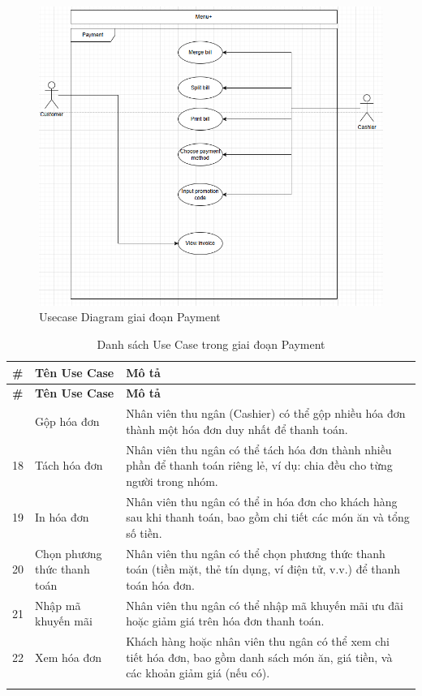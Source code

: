         \begin{figure}[H]
	\centering
	\includegraphics[width=\linewidth]{Images/ucd-payment.png}
	\caption{Usecase Diagram giai đoạn Payment}
        \end{figure}

        \begin{longtable}{|p{1cm}|p{5cm}|p{9cm}|}
        \hline
        \textbf{\#} & \textbf{Tên Use Case} & \textbf{Mô tả} \\ 
        \hline
        \endfirsthead
        \hline
        \textbf{\#} & \textbf{Tên Use Case} & \textbf{Mô tả} \\ 
        \endhead
        \hline
        \endfoot
        \hline
        \endlastfoot
        17 & Gộp hóa đơn & Nhân viên thu ngân (Cashier) có thể gộp nhiều hóa đơn thành một hóa đơn duy nhất để thanh toán. \\ 
        \hline
        18 & Tách hóa đơn & Nhân viên thu ngân có thể tách hóa đơn thành nhiều phần để thanh toán riêng lẻ, ví dụ: chia đều cho từng người trong nhóm. \\ 
        \hline
        19 & In hóa đơn & Nhân viên thu ngân có thể in hóa đơn cho khách hàng sau khi thanh toán, bao gồm chi tiết các món ăn và tổng số tiền. \\ 
        \hline
        20 & Chọn phương thức thanh toán & Nhân viên thu ngân có thể chọn phương thức thanh toán (tiền mặt, thẻ tín dụng, ví điện tử, v.v.) để thanh toán hóa đơn. \\ 
        \hline
        21 & Nhập mã khuyến mãi & Nhân viên thu ngân có thể nhập mã khuyến mãi ưu đãi hoặc giảm giá trên hóa đơn thanh toán. \\ 
        \hline
        22 & Xem hóa đơn & Khách hàng hoặc nhân viên thu ngân có thể xem chi tiết hóa đơn, bao gồm danh sách món ăn, giá tiền, và các khoản giảm giá (nếu có). \\ 
        \hline
        \caption{Danh sách Use Case trong giai đoạn Payment}\\
        \end{longtable}

